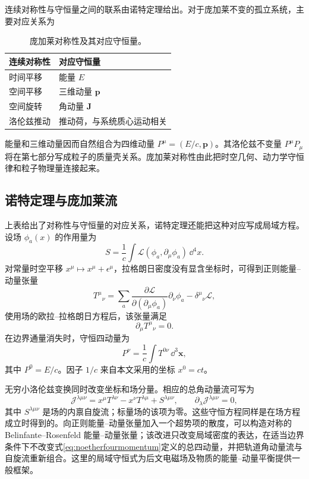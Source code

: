 \documentclass[style=classic,color=full]{lc-article}
\begin{document}
连续对称性与守恒量之间的联系由诺特定理给出。对于庞加莱不变的孤立系统，主要对应关系为
\begin{table}[htbp]
  \centering
  \caption{庞加莱对称性及其对应守恒量。}
  \label{tab:poincare-noether}
  \begin{tabular}{ll}
    \toprule
    连续对称性 & 对应守恒量 \\
    \midrule
    时间平移 & 能量 $E$ \\
    空间平移 & 三维动量 $\bm p$ \\
    空间旋转 & 角动量 $\bm J$ \\
    洛伦兹推动 & 推动荷，与系统质心运动相关 \\
    \bottomrule
  \end{tabular}
\end{table}
能量和三维动量因而自然组合为四维动量 $P^\mu=(E/c,\bm p)$。其洛伦兹不变量 $P^\mu P_\mu$ 将在第七部分写成粒子的质量壳关系。庞加莱对称性由此把时空几何、动力学守恒律和粒子物理量连接起来\cite{weinberg1995,landau}。

\subsection{诺特定理与庞加莱流}

上表给出了对称性与守恒量的对应关系，诺特定理还能把这种对应写成局域方程。设场 $\phi_a(x)$ 的作用量为
\begin{equation}
  S=\frac{1}{c}\int \mathcal L
  (\phi_a,\partial_\mu\phi_a)\,\dd^4x.
  \label{eq:genericfieldaction}
\end{equation}
对常量时空平移 $x^\mu\mapsto x^\mu+\epsilon^\mu$，拉格朗日密度没有显含坐标时，可得到正则能量--动量张量
\begin{equation}
  {T^\mu}_{\nu}
  =\sum_a
  \frac{\partial\mathcal L}
       {\partial(\partial_\mu\phi_a)}
  \partial_\nu\phi_a
  -{\delta^\mu}_{\nu}\mathcal L,
  \label{eq:canonicalenergymomentum}
\end{equation}
使用场的欧拉--拉格朗日方程后，该张量满足
\begin{equation}
  \partial_\mu {T^\mu}_{\nu}=0.
  \label{eq:noethertranslationcurrent}
\end{equation}
在边界通量消失时，守恒四动量为
\begin{equation}
  P^\nu=\frac{1}{c}\int T^{0\nu}\,\dd^3\bm x,
  \label{eq:noetherfourmomentum}
\end{equation}
其中 $P^0=E/c$。因子 $1/c$ 来自本文采用的坐标 $x^0=ct$。

无穷小洛伦兹变换同时改变坐标和场分量。相应的总角动量流可写为
\begin{equation}
  \mathcal J^{\lambda\mu\nu}
  =x^\mu T^{\lambda\nu}
  -x^\nu T^{\lambda\mu}
  +S^{\lambda\mu\nu},
  \qquad
  \partial_\lambda\mathcal J^{\lambda\mu\nu}=0,
  \label{eq:noetherangularmomentumcurrent}
\end{equation}
其中 $S^{\lambda\mu\nu}$ 是场的内禀自旋流；标量场的该项为零。这些守恒方程同样是在场方程成立时得到的。向正则能量--动量张量加入一个超势项的散度，可以构造对称的 Belinfante--Rosenfeld 能量--动量张量；该改进只改变局域密度的表达，在适当边界条件下不改变式\eqref{eq:noetherfourmomentum}定义的总四动量，并把轨道角动量流与自旋流重新组合。这里的局域守恒式为后文电磁场及物质的能量--动量平衡提供一般框架\cite{landau,weinberg1995}。
\end{document}
